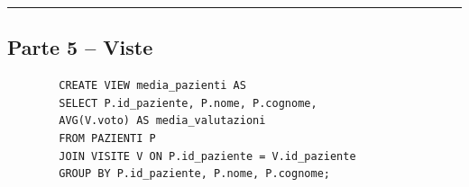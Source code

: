 \documentclass[a4paper,12pt]{article}
\begin{document}
	\noindent\rule{\linewidth}{0.4pt}
	
	\subsection*{Parte 5 -- Viste}
	
	\begin{verbatim}
		CREATE VIEW media_pazienti AS
		SELECT P.id_paziente, P.nome, P.cognome,
		AVG(V.voto) AS media_valutazioni
		FROM PAZIENTI P
		JOIN VISITE V ON P.id_paziente = V.id_paziente
		GROUP BY P.id_paziente, P.nome, P.cognome;
	\end{verbatim}
	
	
	
\end{document}
